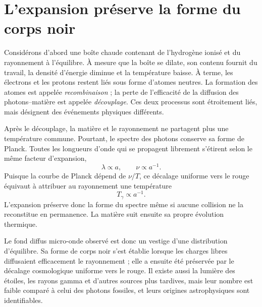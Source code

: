 \section{L’expansion préserve la forme du corps noir}

Considérons d’abord une boîte chaude contenant de l’hydrogène ionisé et du rayonnement à l’équilibre. À mesure que la boîte se dilate, son contenu fournit du travail, la densité d’énergie diminue et la température baisse. À terme, les électrons et les protons restent liés sous forme d’atomes neutres. La formation des atomes est appelée \emph{recombinaison} ; la perte de l’efficacité de la diffusion des photons--matière est appelée \emph{découplage}. Ces deux processus sont étroitement liés, mais désignent des événements physiques différents.

Après le découplage, la matière et le rayonnement ne partagent plus une température commune. Pourtant, le spectre des photons conserve sa forme de Planck. Toutes les longueurs d’onde qui se propagent librement s’étirent selon le même facteur d’expansion,
\begin{equation}
\lambda\propto a,
\qquad
\nu\propto a^{-1}.
\end{equation}
Puisque la courbe de Planck dépend de \(\nu/T\), ce décalage uniforme vers le rouge équivaut à attribuer au rayonnement une température
\begin{equation}
\boxed{T_\gamma\propto a^{-1}.}
\label{eq:c07-temperature-scaling}
\end{equation}
L’expansion préserve donc la forme du spectre même si aucune collision ne la reconstitue en permanence. La matière suit ensuite sa propre évolution thermique.

Le fond diffus micro-onde observé est donc un vestige d’une distribution d’équilibre. Sa forme de corps noir s’est établie lorsque les charges libres diffusaient efficacement le rayonnement ; elle a ensuite été préservée par le décalage cosmologique uniforme vers le rouge. Il existe aussi la lumière des étoiles, les rayons gamma et d’autres sources plus tardives, mais leur nombre est faible comparé à celui des photons fossiles, et leurs origines astrophysiques sont identifiables.

\begin{classroomqa}
\end{classroomqa}

